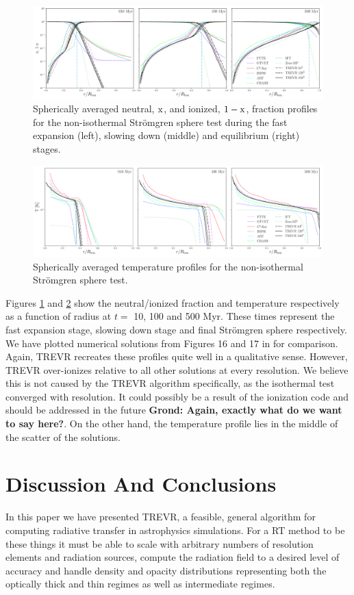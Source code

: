 \documentclass[fleq,usenatbib]{mnras}
\newcommand{\acro}{TREVR}
\newcommand{\comment}[1]{\textbf{\color{red}#1}}
\newcommand{\strom}{Str\"omgren}
\begin{document}
\begin{figure}
\includegraphics[width=0.95\linewidth]{Figures/strom_fraction.pdf}
\caption{Spherically averaged neutral, $\rm x$, and ionized, $\rm 1-x$, 
fraction profiles for the non-isothermal \strom{} sphere test during the fast 
expansion (left), slowing down (middle) and equilibrium (right) stages.}
\label{fig:stromtherm}
\end{figure}
\begin{figure}
\includegraphics[width=0.95\linewidth]{Figures/strom_temp.pdf}
\caption{Spherically averaged temperature profiles for the non-isothermal 
\strom{} sphere test.}
\label{fig:stromtemp}
\end{figure}
Figures \ref{fig:stromtherm} and \ref{fig:stromtemp} show the neutral/ionized 
fraction and temperature respectively as a function of radius at $t=$ 10, 100
and 500 Myr. These times represent the fast expansion stage, slowing down 
stage and final \strom{} sphere respectively. We have plotted numerical 
solutions from Figures 16 and 17 in \cite{ilievEt06} for comparison. Again, 
\acro{} recreates these profiles quite well in a qualitative sense. However, 
\acro{} over-ionizes relative to all other solutions at every resolution. We 
believe this is not caused by the \acro{} algorithm specifically, as the 
isothermal test converged with resolution. It could possibly be a result of 
the ionization code and should be addressed in the future \comment{Grond:
Again, exactly what do we want to say here?}. On the other hand, the 
temperature profile lies in the middle of the scatter of the \cite{ilievEt06} 
solutions.

\section{Discussion And Conclusions}\label{sec:disc}
In this paper we have presented \acro{}, a feasible, general algorithm for 
computing radiative transfer in astrophysics simulations. For a RT method to 
be these things it must be able to scale with arbitrary numbers of resolution 
elements and radiation sources, compute the radiation field to a desired level 
of accuracy and handle density and opacity distributions representing both the 
optically thick and thin regimes as well as intermediate regimes.
\end{document}
